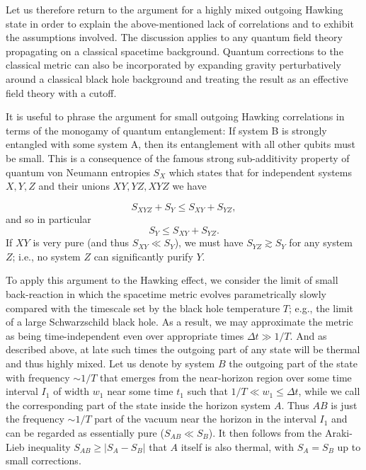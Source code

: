 \documentclass[12pt]{article}
\begin{document}
Let us therefore return to the argument for a highly mixed outgoing Hawking state in order to explain the above-mentioned lack of correlations and to exhibit the assumptions involved.  The discussion applies to any quantum field theory propagating on a classical spacetime background.  Quantum corrections to the classical metric can also be incorporated by expanding gravity perturbatively around a classical black hole background and treating the result as an effective field theory with a cutoff.

It is useful to phrase the argument for small outgoing Hawking correlations in terms of the monogamy of quantum entanglement: If system B is strongly entangled with some system A, then its entanglement with all other qubits must be small.  This is a consequence of the famous strong sub-additivity property of quantum von Neumann entropies $S_X$ which states that for independent systems $X,Y,Z$ and their unions $XY, YZ, XYZ$ we have

\begin{equation}
\label{SSA}
S_{XYZ} + S_Y \le S_{XY} + S_{YZ},
\end{equation}
and so in particular
\begin{equation}
\label{SimpSSA}
S_Y \le S_{XY} + S_{YZ}.
\end{equation}
If $XY$ is very pure (and thus $S_{XY} \ll S_Y$), we must have $S_{YZ} \gtrsim S_Y$  for any system $Z$; i.e., no system $Z$ can significantly purify $Y$.

To apply this argument to the Hawking effect, we consider the limit of small back-reaction in which the spacetime metric evolves parametrically slowly compared with the timescale set by the black hole temperature $T$; e.g., the limit of a large Schwarzschild black hole.  As a result, we may approximate the metric as being time-independent even over appropriate times $\Delta t \gg 1/T$.  And as described above, at late such times the outgoing part of any state will be thermal and thus highly mixed.  Let us denote by system $B$ the outgoing part of the state with frequency $\sim 1/T$ that emerges from the near-horizon region over some time interval $I_1$ of width $w_1$ near some time $t_1$ such that $1/T \ll w_1 \le \Delta t$, while we call the corresponding part of the state inside the horizon system $A$.  Thus $AB$ is just the frequency $\sim 1/T$ part of the vacuum near the horizon in the interval $I_1$ and can be regarded as essentially pure ($S_{AB} \ll S_B$).  It then follows from the Araki-Lieb inequality $S_{AB} \ge |S_A - S_B|$ that $A$ itself is also thermal, with $S_A = S_B$ up to small corrections.
\end{document}
